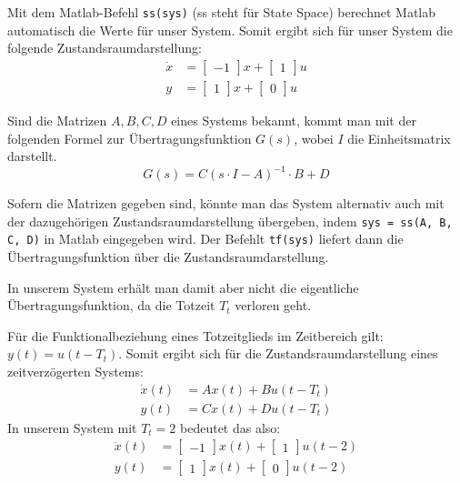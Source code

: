 Mit dem Matlab-Befehl \texttt{ss(sys)} (ss steht für State Space) berechnet Matlab automatisch die Werte für unser System. Somit ergibt sich für unser System die folgende Zustandsraumdarstellung:
\begin{align*}
    \dot x & = \begin{bmatrix}
        -1
    \end{bmatrix}x + \begin{bmatrix}
        1
    \end{bmatrix}u \\
    y & = \begin{bmatrix}
        1
    \end{bmatrix}x + \begin{bmatrix}
        0
    \end{bmatrix}u
\end{align*}

Sind die Matrizen $A, B, C, D$ eines Systems bekannt, kommt man mit der folgenden Formel zur Übertragungsfunktion $G(s)$, wobei $I$ die Einheitsmatrix darstellt.
\[
    G(s) = C(s \cdot I - A)^{-1} \cdot B + D
\]

Sofern die Matrizen gegeben sind, könnte man das System alternativ auch mit der dazugehörigen Zustandsraumdarstellung übergeben, indem \texttt{sys = ss(A, B, C, D)} in Matlab eingegeben wird. Der Befehlt \texttt{tf(sys)} liefert dann die Übertragungsfunktion über die Zustandsraumdarstellung.

In unserem System erhält man damit aber nicht die eigentliche Übertragungsfunktion, da die Totzeit $T_t$ verloren geht.

Für die Funktionalbeziehung eines Totzeitglieds im Zeitbereich gilt: $y(t) = u(t-T_t)$. Somit ergibt sich für die Zustandsraumdarstellung eines zeitverzögerten Systems:
\begin{align*}
    \dot x(t) & = Ax(t) + Bu(t - T_t) \nonumber \\
    y(t) & = Cx(t) + Du(t - T_t)
\end{align*}
In unserem System mit $T_t = 2$ bedeutet das also:
\begin{align*}
    \dot x(t) & = \begin{bmatrix}
        -1
    \end{bmatrix}x(t) + \begin{bmatrix}
        1
    \end{bmatrix}u(t - 2) \nonumber \\
    y(t) & = \begin{bmatrix}
        1
    \end{bmatrix}x(t) + \begin{bmatrix}
        0
    \end{bmatrix}u(t - 2)
\end{align*}

